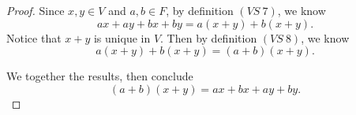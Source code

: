 \begin{Exercise}
	\begin{proof}
		Since $x,y \in V$ and $a,b\in F$, by definition $(VS\ 7)$, we know
		$$
		a x+a y+b x+b y = a(x+y) + b(x+y).
		$$
		Notice that $x+y$ is unique in $V$. Then by definition $(VS\ 8)$, we know
		$$
		a(x+y) + b(x+y) = (a+b)(x+y).
		$$
		
		We together the results, then conclude
		$$
		(a+b)(x+y) = a x + b x + a y + b y.
		$$
	\end{proof}
\end{Exercise}
